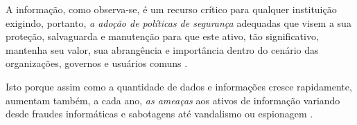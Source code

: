 A informação, como observa-se, é um recurso crítico para qualquer instituição exigindo, portanto, \textit{a adoção de políticas de segurança} adequadas que visem a sua proteção, salvaguarda e manutenção para que este ativo, tão significativo, mantenha seu valor, sua abrangência e importância dentro do cenário das organizações, governos e usuários comuns \cite{marciano_segurancda_nodate}. 

Isto porque assim como a quantidade de dados e informações cresce rapidamente, aumentam também, a cada ano, \textit{as ameaças} aos ativos de informação variando desde fraudes informáticas e sabotagens até vandalismo ou espionagem \cite{casaca_porque_2013}.



